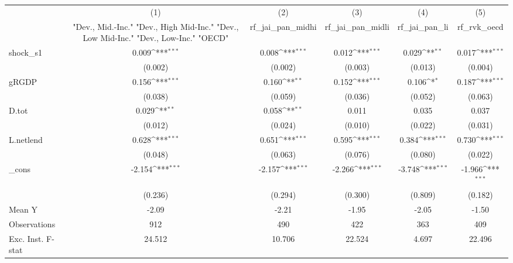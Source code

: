 {
\def\sym#1{\ifmmode^{#1}\else\(^{#1}\)\fi}
\begin{tabular}{l*{5}{c}}
\toprule
            &\multicolumn{1}{c}{(1)}&\multicolumn{1}{c}{(2)}&\multicolumn{1}{c}{(3)}&\multicolumn{1}{c}{(4)}&\multicolumn{1}{c}{(5)}\\
            &\multicolumn{1}{c}{ "Dev., Mid.-Inc." "Dev., High Mid-Inc." "Dev., Low Mid-Inc." "Dev., Low-Inc." "OECD" }&\multicolumn{1}{c}{rf\_jai\_pan\_midhi}&\multicolumn{1}{c}{rf\_jai\_pan\_midli}&\multicolumn{1}{c}{rf\_jai\_pan\_li}&\multicolumn{1}{c}{rf\_rvk\_oecd}\\
\midrule
shock\_s1    &       0.009\sym{***}&       0.008\sym{***}&       0.012\sym{***}&       0.029\sym{**} &       0.017\sym{***}\\
            &     (0.002)         &     (0.002)         &     (0.003)         &     (0.013)         &     (0.004)         \\
\addlinespace
gRGDP       &       0.156\sym{***}&       0.160\sym{**} &       0.152\sym{***}&       0.106\sym{*}  &       0.187\sym{***}\\
            &     (0.038)         &     (0.059)         &     (0.036)         &     (0.052)         &     (0.063)         \\
\addlinespace
D.tot       &       0.029\sym{**} &       0.058\sym{**} &       0.011         &       0.035         &       0.037         \\
            &     (0.012)         &     (0.024)         &     (0.010)         &     (0.022)         &     (0.031)         \\
\addlinespace
L.netlend   &       0.628\sym{***}&       0.651\sym{***}&       0.595\sym{***}&       0.384\sym{***}&       0.730\sym{***}\\
            &     (0.048)         &     (0.063)         &     (0.076)         &     (0.080)         &     (0.022)         \\
\addlinespace
\_cons      &      -2.154\sym{***}&      -2.157\sym{***}&      -2.266\sym{***}&      -3.748\sym{***}&      -1.966\sym{***}\\
            &     (0.236)         &     (0.294)         &     (0.300)         &     (0.809)         &     (0.182)         \\
\midrule
Mean Y      &       -2.09         &       -2.21         &       -1.95         &       -2.05         &       -1.50         \\
Observations&         912         &         490         &         422         &         363         &         409         \\
Exc. Inst. F-stat&      24.512         &      10.706         &      22.524         &       4.697         &      22.496         \\
\bottomrule
\end{tabular}
}
